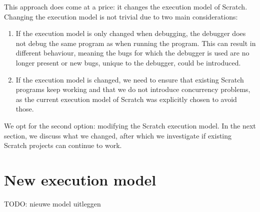 \documentclass[../main]{subfiles}
\begin{document}
This approach does come at a price: it changes the execution model of Scratch.
Changing the execution model is not trivial due to two main considerations:

\begin{enumerate}
    \item If the execution model is only changed when debugging, the debugger does not debug the same program as when running the program.
        This can result in different behaviour, meaning the bugs for which the debugger is used are no longer present or new bugs, unique to the debugger, could be introduced.
    \item If the execution model is changed, we need to ensure that existing Scratch programs keep working and that we do not introduce concurrency problems, as the current execution model of Scratch was explicitly chosen to avoid those.
\end{enumerate}

We opt for the second option: modifying the Scratch execution model.
In the next section, we discuss what we changed, after which we investigate if existing Scratch projects can continue to work.

\section{New execution model}\label{sec:a-family-of-new-execution-models}

TODO: nieuwe model uitleggen
\end{document}

